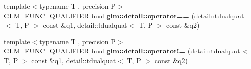 \begin{DoxyCompactItemize}
\item 
\hypertarget{namespaceglm_1_1detail_a4ecfd668de208187042cb2a90d669e4e}{{\footnotesize template$<$typename T , precision P$>$ }\\G\-L\-M\-\_\-\-F\-U\-N\-C\-\_\-\-Q\-U\-A\-L\-I\-F\-I\-E\-R bool {\bfseries glm\-::detail\-::operator==} (detail\-::tdualquat$<$ T, P $>$ const \&q1, detail\-::tdualquat$<$ T, P $>$ const \&q2)}\label{namespaceglm_1_1detail_a4ecfd668de208187042cb2a90d669e4e}

\item 
\hypertarget{namespaceglm_1_1detail_a3a29e0a166da991141a043986318f44f}{{\footnotesize template$<$typename T , precision P$>$ }\\G\-L\-M\-\_\-\-F\-U\-N\-C\-\_\-\-Q\-U\-A\-L\-I\-F\-I\-E\-R bool {\bfseries glm\-::detail\-::operator!=} (detail\-::tdualquat$<$ T, P $>$ const \&q1, detail\-::tdualquat$<$ T, P $>$ const \&q2)}\label{namespaceglm_1_1detail_a3a29e0a166da991141a043986318f44f}


\end{DoxyCompactItemize}
